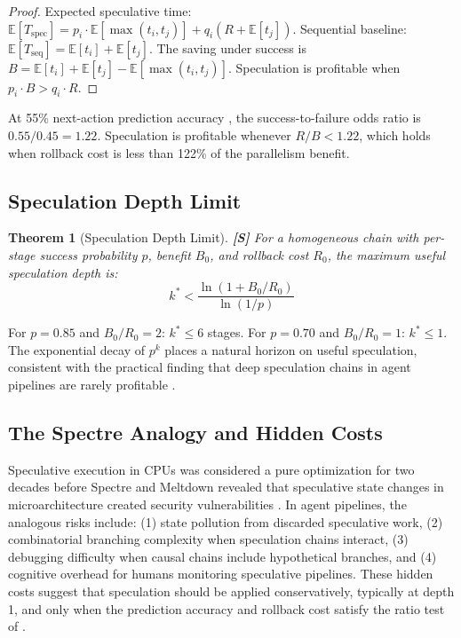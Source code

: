 \documentclass[11pt, a4paper, copyright]{googledeepmind}
\newtheorem{theorem}{Theorem}[section]
\newcommand{\E}{\mathbb{E}}
\begin{document}
\begin{proof}
Expected speculative time: $\E[T_{\mathrm{spec}}] = p_i \cdot \E[\max(t_i, t_j)] + q_i(R + \E[t_j])$. Sequential baseline: $\E[T_{\mathrm{seq}}] = \E[t_i] + \E[t_j]$. The saving under success is $B = \E[t_i] + \E[t_j] - \E[\max(t_i, t_j)]$. Speculation is profitable when $p_i \cdot B > q_i \cdot R$.
\end{proof}

At 55\% next-action prediction accuracy \citep{zhou2025speculative}, the success-to-failure odds ratio is $0.55/0.45 = 1.22$. Speculation is profitable whenever $R/B < 1.22$, which holds when rollback cost is less than 122\% of the parallelism benefit.

\subsection{Speculation Depth Limit}

\begin{theorem}[Speculation Depth Limit]\label{thm:depth}
\textbf{[S]} For a homogeneous chain with per-stage success probability $p$, benefit $B_0$, and rollback cost $R_0$, the maximum useful speculation depth is:
\[
    k^* < \frac{\ln(1 + B_0/R_0)}{\ln(1/p)}
\]
\end{theorem}

For $p = 0.85$ and $B_0/R_0 = 2$: $k^* \leq 6$ stages. For $p = 0.70$ and $B_0/R_0 = 1$: $k^* \leq 1$. The exponential decay of $p^k$ places a natural horizon on useful speculation, consistent with the practical finding that deep speculation chains in agent pipelines are rarely profitable \citep{zhou2025speculative}.

\subsection{The Spectre Analogy and Hidden Costs}

Speculative execution in CPUs was considered a pure optimization for two decades before Spectre and Meltdown revealed that speculative state changes in microarchitecture created security vulnerabilities \citep{spectre2018}. In agent pipelines, the analogous risks include: (1) state pollution from discarded speculative work, (2) combinatorial branching complexity when speculation chains interact, (3) debugging difficulty when causal chains include hypothetical branches, and (4) cognitive overhead for humans monitoring speculative pipelines. These hidden costs suggest that speculation should be applied conservatively, typically at depth 1, and only when the prediction accuracy and rollback cost satisfy the ratio test of .
\end{document}
